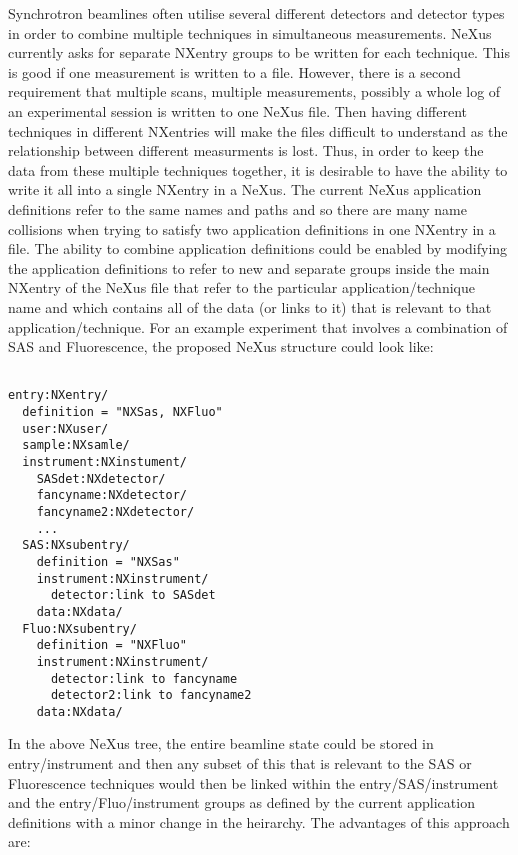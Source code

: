 \documentclass[a4paper]{article}\usepackage[dvips]{graphicx}
\begin{document}
Synchrotron beamlines often utilise several different detectors and detector types in order 
to combine multiple techniques in simultaneous measurements. NeXus currently asks for separate 
NXentry groups to be written for each technique. This is good if one measurement is written to 
a file. However, there is a second requirement that multiple scans, multiple measurements, possibly 
a whole log of an experimental session is written to one NeXus file. Then having different 
techniques in different NXentries will make the files difficult to understand as the relationship
between different measurments is lost.  Thus, in order to keep the data from these multiple 
techniques together, it is desirable to have the ability to write it all into a single NXentry in 
a NeXus. The current NeXus application definitions refer to the same names and paths and so 
there are many name collisions when trying to satisfy two application definitions in one NXentry in 
a file. The ability to combine application definitions could be enabled by modifying the application 
definitions to refer to new and separate groups inside the main NXentry of the NeXus file that refer 
to the particular application/technique name and which contains all of the data (or links to it) that 
is relevant to that application/technique. For an example experiment that involves a combination of 
SAS and Fluorescence, the proposed NeXus structure could look like:


\begin{verbatim}

entry:NXentry/
  definition = "NXSas, NXFluo"
  user:NXuser/
  sample:NXsamle/
  instrument:NXinstument/
    SASdet:NXdetector/
    fancyname:NXdetector/
    fancyname2:NXdetector/
    ...
  SAS:NXsubentry/
    definition = "NXSas"
    instrument:NXinstrument/
      detector:link to SASdet
    data:NXdata/
  Fluo:NXsubentry/
    definition = "NXFluo"
    instrument:NXinstrument/
      detector:link to fancyname
      detector2:link to fancyname2
    data:NXdata/
\end{verbatim}

In the above NeXus tree, the entire beamline state could be stored in entry/instrument and then any subset 
of this that is relevant to the SAS or Fluorescence techniques would then be linked within the 
entry/SAS/instrument and the entry/Fluo/instrument groups as defined by the current application definitions 
with a minor change in the heirarchy. The advantages of this approach are:
\end{document}
